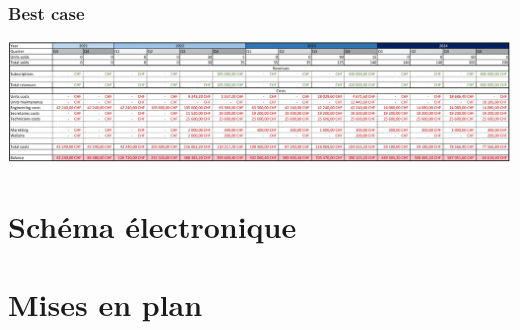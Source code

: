\documentclass[11pt,titlepage]{report}
\begin{document}
\subsection{Best case}
\includegraphics[angle=90, height=\textheight]{Images/business/best.png}

\chapter{Schéma électronique}


\chapter{Mises en plan}


\setlength{\topmargin}{-2.2mm} %
\printbibliography[heading=bibintoc]
\end{document}
